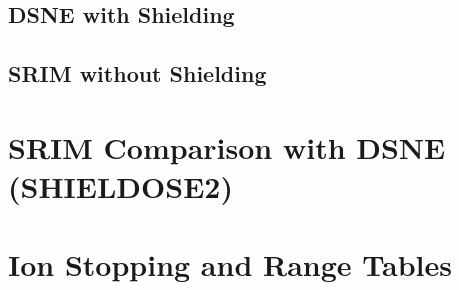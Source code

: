 \documentclass{hitec}
\begin{document}
\subsection{DSNE with Shielding}\label{ssec:DSNEwithShielding}


\subsection{SRIM without Shielding}\label{ssec:SRIMnoShielding}

\section{SRIM Comparison with DSNE (SHIELDOSE2)}


\appendix
{}
\section{Ion Stopping and Range Tables}
\label{asec:IonStoppingRangeTables}








\end{document}
